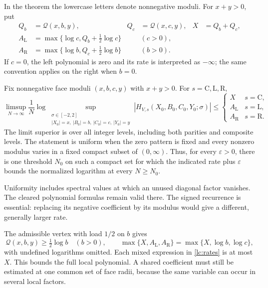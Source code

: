 In the theorem the lowercase letters denote nonnegative moduli.
For \(x+y>0\), put
\begin{equation}\label{lc:rates}
\begin{aligned}
 Q_b&=\mathcal Q(x,b,y),&Q_c&=\mathcal Q(x,c,y),&X&=Q_b+Q_c,\\
 A_{\mathrm L}&=\max\{\log c,Q_b+\tfrac12\log c\}&&(c>0),\\
 A_{\mathrm R}&=\max\{\log b,Q_c+\tfrac12\log b\}&&(b>0).
\end{aligned}
\end{equation}
If \(c=0\), the left polynomial is zero and its rate is interpreted
as \(-\infty\); the same convention applies on the right when \(b=0\).

\begin{theorem}\label{lc:main}
Fix nonnegative face moduli \((x,b,c,y)\) with \(x+y>0\). For
\(s=\mathrm C,\mathrm L,\mathrm R\),
\begin{equation}\label{lc:main-rate}
 \limsup_{N\to\infty}\frac1N
 \log\sup_{\substack{\sigma\in[-2,2]\\
 |X_0|=x,\ |B_0|=b,\ |C_0|=c,\ |Y_0|=y}}
 |H_{V,s}(X_0,B_0,C_0,Y_0;\sigma)|
 \le
 \begin{cases}
 X&s=\mathrm C,\\
 A_{\mathrm L}&s=\mathrm L,\\
 A_{\mathrm R}&s=\mathrm R.
 \end{cases}
\end{equation}
The limit superior is over all integer levels, including both parities
and composite levels. The statement is uniform when the zero pattern
is fixed and every nonzero modulus varies in a fixed compact subset
of \((0,\infty)\). Thus, for every \(\varepsilon>0\), there is one
threshold \(N_0\) on such a compact set for which the indicated rate
plus \(\varepsilon\) bounds the normalized logarithm at every \(N\ge N_0\).
\end{theorem}

Uniformity includes spectral values at which an unused diagonal
factor vanishes. The cleared polynomial formulas remain valid there.
The signed recurrence is essential: replacing its negative coefficient
by its modulus would give a different, generally larger rate.

The admissible vertex with load \(1/2\) on \(b\) gives
\begin{equation}\label{lc:spectator}
 \mathcal Q(x,b,y)\ge\tfrac12\log b\quad(b>0),\qquad
 \max\{X,A_{\mathrm L},A_{\mathrm R}\}=\max\{X,\log b,\log c\},
\end{equation}
with undefined logarithms omitted. Each mixed expression in
\eqref{lc:rates} is at most \(X\). This bounds the full local polynomial. A shared coefficient must still
be estimated at one common set of face radii, because the same variable
can occur in several local factors.

